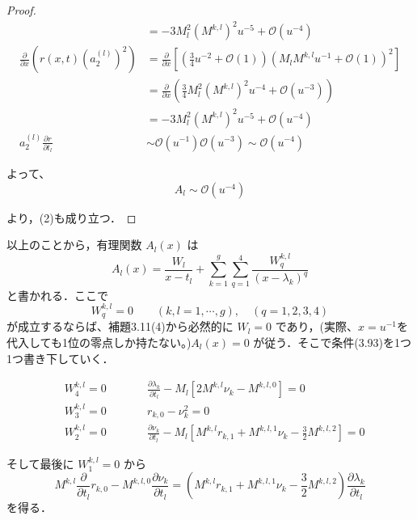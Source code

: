 \begin{story}
\begin{proof}
\begin{align*}
    &= -3 M_l^2 \left(M^{k,l}\right)^2 u^{-5} + \mathcal{O}(u^{-4}) \\[8pt]
    \frac{\partial}{\partial x} \left( r(x,t) (a_2^{(l)})^2 \right) &= \frac{\partial}{\partial x} \left[ \left( \frac{3}{4} u^{-2} + \mathcal{O}(1) \right) \left( M_l M^{k,l} u^{-1} + \mathcal{O}(1) \right)^2 \right] \\
    &= \frac{\partial}{\partial x} \left( \frac{3}{4} M_l^2 \left(M^{k,l}\right)^2 u^{-4} + \mathcal{O}(u^{-3}) \right) \\
    &= -3 M_l^2 \left(M^{k,l}\right)^2 u^{-5} + \mathcal{O}(u^{-4}) \\[8pt]
    a_2^{(l)} \frac{\partial r}{\partial t_l} &\sim \mathcal{O}(u^{-1}) \mathcal{O}(u^{-3}) \sim \mathcal{O}(u^{-4})
\end{align*}

よって、
\begin{equation*}
    A_l \sim \mathcal{O}(u^{-4})
\end{equation*}

より，(2)も成り立つ．
\end{proof}

\vspace{1em}
以上のことから，有理関数 $A_l(x)$ は
\[
    A_l(x) = \frac{W_l}{x-t_l} + \sum_{k=1}^g \sum_{q=1}^4 \frac{W_q^{k,l}}{(x-\lambda_k)^q}
\]
と書かれる．ここで
\begin{equation} \tag{3.93}
    W_q^{k,l} = 0 \qquad (k, l = 1, \cdots, g), \quad (q = 1, 2, 3, 4)
\end{equation}
が成立するならば、補題3.11(4)から必然的に $W_l=0$ であり，(実際、$x=u^{-1}$を代入しても1位の零点しか持たない。)$A_l(x)=0$ が従う．そこで条件(3.93)を1つ1つ書き下していく．

\begin{align*}
    &W_4^{k,l} = 0 \qquad &&\frac{\partial \lambda_k}{\partial t_l} - M_l \left[ 2M^{k,l}\nu_k - M^{k,l,0} \right] = 0 \\[8pt]
    &W_3^{k,l} = 0 \qquad &&r_{k,0} - \nu_k^2 = 0 \\[8pt]
    &W_2^{k,l} = 0 \qquad &&\frac{\partial \nu_k}{\partial t_l} - M_l \left[ M^{k,l}r_{k,1} + M^{k,l,1}\nu_k - \frac{3}{2}M^{k,l,2} \right] = 0
\end{align*}

そして最後に $W_1^{k,l}=0$ から
\[
    M^{k,l} \frac{\partial}{\partial t_l} r_{k,0} - M^{k,l,0} \frac{\partial \nu_k}{\partial t_l} = \left( M^{k,l}r_{k,1} + M^{k,l,1}\nu_k - \frac{3}{2}M^{k,l,2} \right) \frac{\partial \lambda_k}{\partial t_l}
\]
を得る．
\end{story}

